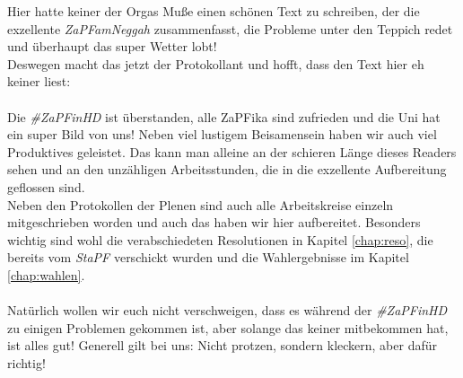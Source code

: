
\vspace{4cm}

Hier hatte keiner der Orgas Muße einen schönen Text zu schreiben, der die exzellente \textit{ZaPFamNeggah} zusammenfasst,
die Probleme unter den Teppich redet und überhaupt das super Wetter lobt! \\
Deswegen macht das jetzt der Protokollant und hofft, dass den Text hier eh keiner liest: \\ \\

Die \textit{\#ZaPFinHD} ist überstanden, alle ZaPFika sind zufrieden und die Uni hat ein super Bild von uns! 
Neben viel lustigem Beisamensein haben wir auch viel Produktives geleistet. Das kann man alleine an der schieren Länge dieses Readers sehen und an den unzähligen Arbeitsstunden, die in die exzellente Aufbereitung geflossen sind. \\
Neben den Protokollen der Plenen sind auch alle Arbeitskreise einzeln mitgeschrieben worden und auch das haben wir hier aufbereitet. Besonders wichtig sind wohl die verabschiedeten Resolutionen in Kapitel \ref{chap:reso}, die bereits vom \textit{StaPF} verschickt wurden und die Wahlergebnisse im Kapitel \ref{chap:wahlen}. \\ \\

Natürlich wollen wir euch nicht verschweigen, dass es während der \textit{\#ZaPFinHD} zu einigen Problemen gekommen ist, aber solange das keiner mitbekommen hat, ist alles gut! Generell gilt bei uns: Nicht protzen, sondern kleckern, aber dafür richtig!

